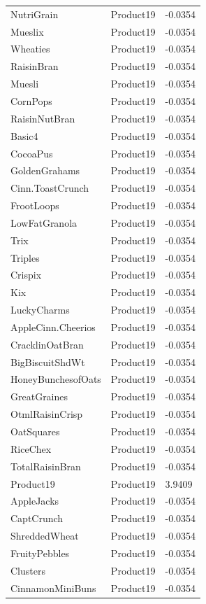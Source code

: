 \begin{table}[!htbp]
\begin{tabular}{lll}
\\
NutriGrain & Product19 & -0.0354
\\
Mueslix & Product19 & -0.0354
\\
Wheaties & Product19 & -0.0354
\\
RaisinBran & Product19 & -0.0354
\\
Muesli & Product19 & -0.0354
\\
CornPops & Product19 & -0.0354
\\
RaisinNutBran & Product19 & -0.0354
\\
Basic4 & Product19 & -0.0354
\\
CocoaPus & Product19 & -0.0354
\\
GoldenGrahams & Product19 & -0.0354
\\
Cinn.ToastCrunch & Product19 & -0.0354
\\
FrootLoops & Product19 & -0.0354
\\
LowFatGranola & Product19 & -0.0354
\\
Trix & Product19 & -0.0354
\\
Triples & Product19 & -0.0354
\\
Crispix & Product19 & -0.0354
\\
Kix & Product19 & -0.0354
\\
LuckyCharms & Product19 & -0.0354
\\
AppleCinn.Cheerios & Product19 & -0.0354
\\
CracklinOatBran & Product19 & -0.0354
\\
BigBiscuitShdWt & Product19 & -0.0354
\\
HoneyBunchesofOats & Product19 & -0.0354
\\
GreatGraines & Product19 & -0.0354
\\
OtmlRaisinCrisp & Product19 & -0.0354
\\
OatSquares & Product19 & -0.0354
\\
RiceChex & Product19 & -0.0354
\\
TotalRaisinBran & Product19 & -0.0354
\\
Product19 & Product19 & 3.9409
\\
AppleJacks & Product19 & -0.0354
\\
CaptCrunch & Product19 & -0.0354
\\
ShreddedWheat & Product19 & -0.0354
\\
FruityPebbles & Product19 & -0.0354
\\
Clusters & Product19 & -0.0354
\\
CinnamonMiniBuns & Product19 & -0.0354

\end{tabular}
\end{table}
